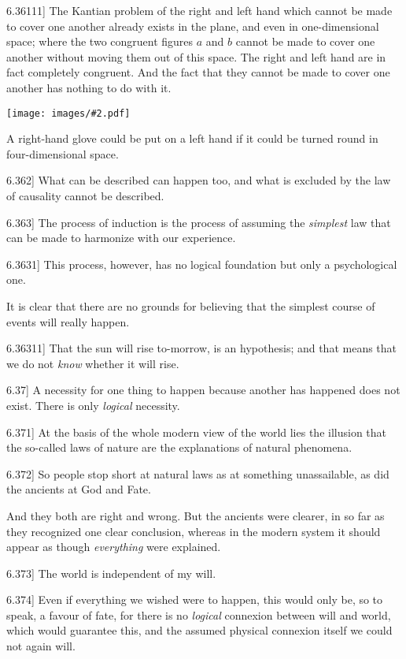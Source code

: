 \documentclass[12pt,oneside]{book}[2007/10/19]
\newcommand{\PropositionE}[2]{%
  \item[\phantomsection\label{PropE:#1}\PropGRef{#1}] #2%
}
\newcommand{\PropGRef}[1]{\hyperref[PropG:#1]{#1}}
\newcommand{\Illustration}[2][0.3\textwidth]{%
  \begin{center}
  \texttt{[image: images/\#2.pdf]}
  \end{center}
}
\begin{document}
\begin{propositions}
\PropositionE{6.36111}
{The Kantian problem of the right and left hand
which cannot be made to cover one another already
exists in the plane, and even in one-di\-men\-sio\-nal
space; where the two congruent figures $a$ and $b$
cannot be made to cover one another without
moving them out of this space. The right and
left hand are in fact completely congruent. And
the fact that they cannot be made to cover one
another has nothing to do with it.
\Illustration[0.45\textwidth]{space}

A right-hand glove could be put on a left hand
if it could be turned round in four-dimensional
space.}


\PropositionE{6.362}
{What can be described can happen too, and
what is excluded by the law of causality cannot be
described.}


\PropositionE{6.363}
{The process of induction is the process of
assuming the \emph{simplest} law that can be made to
harmonize with our experience.}


\PropositionE{6.3631}
{This process, however, has no logical foundation
but only a psychological one.

It is clear that there are no grounds for believing
that the simplest course of events will really
happen.}


\PropositionE{6.36311}
{That the sun will rise to-morrow, is an hypothesis;
and that means that we do not \emph{know} whether
it will rise.}


\PropositionE{6.37}
{A necessity for one thing to happen because
another has happened does not exist. There is
only \emph{logical} necessity.}


\PropositionE{6.371}
{At the basis of the whole modern view of
the world lies the illusion that the so-called
laws of nature are the explanations of natural
phenomena.}


\PropositionE{6.372}
{So people stop short at natural laws as at something
unassailable, as did the ancients at God
and Fate.

And they both are right and wrong. But the
ancients were clearer, in so far as they recognized
one clear conclusion, whereas in the modern
system it should appear as though \emph{everything} were
explained.}


\PropositionE{6.373}
{The world is independent of my will.}


\PropositionE{6.374}
{Even if everything we wished were to happen,
this would only be, so to speak, a favour of
fate, for there is no \emph{logical} connexion between will
and world, which would guarantee this, and the
assumed physical connexion itself we could not
again will.}



\end{propositions}
\end{document}
